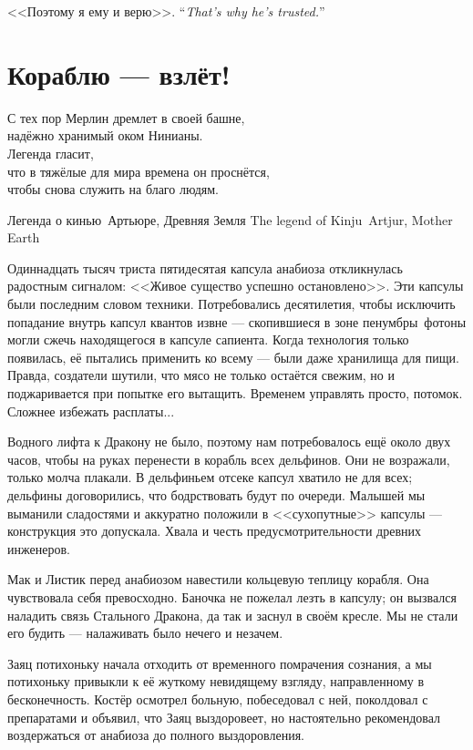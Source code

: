 {<<Поэтому я ему и верю>>.}
{``\emph{That's why he's trusted.}''}

\section{Кораблю --- взлёт!}

\epigraph{
С тех пор Мерлин дремлет в своей башне,\\
надёжно хранимый оком Нинианы.\\
Легенда гласит,\\
что в тяжёлые для мира времена он проснётся,\\
чтобы снова служить на благо людям.
}{
{Легенда о кинью\FM\ Артьюре, Древняя Земля}
{The legend of Kinju\FM\ Artjur, Mother Earth}
}

Одиннадцать тысяч триста пятидесятая капсула анабиоза откликнулась радостным сигналом: <<Живое существо успешно остановлено>>.
Эти капсулы были последним словом техники.
Потребовались десятилетия, чтобы исключить попадание внутрь капсул квантов извне --- скопившиеся в зоне пенумбры\FM\ фотоны могли сжечь находящегося в капсуле сапиента.
Когда технология только появилась, её пытались применить ко всему --- были даже хранилища для пищи.
Правда, создатели шутили, что мясо не только остаётся свежим, но и поджаривается при попытке его вытащить.
Временем управлять просто, потомок.
Сложнее избежать расплаты...

Водного лифта к Дракону не было, поэтому нам потребовалось ещё около двух часов, чтобы на руках перенести в корабль всех дельфинов.
Они не возражали, только молча плакали.
В дельфиньем отсеке капсул хватило не для всех;
дельфины договорились, что бодрствовать будут по очереди.
Малышей мы выманили сладостями и аккуратно положили в <<сухопутные>> капсулы --- конструкция это допускала.
Хвала и честь предусмотрительности древних инженеров.

Мак и Листик перед анабиозом навестили кольцевую теплицу корабля.
Она чувствовала себя превосходно.
Баночка не пожелал лезть в капсулу;
он вызвался наладить связь Стального Дракона, да так и заснул в своём кресле.
Мы не стали его будить --- налаживать было нечего и незачем.

Заяц потихоньку начала отходить от временного помрачения сознания, а мы потихоньку привыкли к её жуткому невидящему взгляду, направленному в бесконечность.
Костёр осмотрел больную, побеседовал с ней, поколдовал с препаратами и объявил, что Заяц выздоровеет, но настоятельно рекомендовал воздержаться от анабиоза до полного выздоровления.

